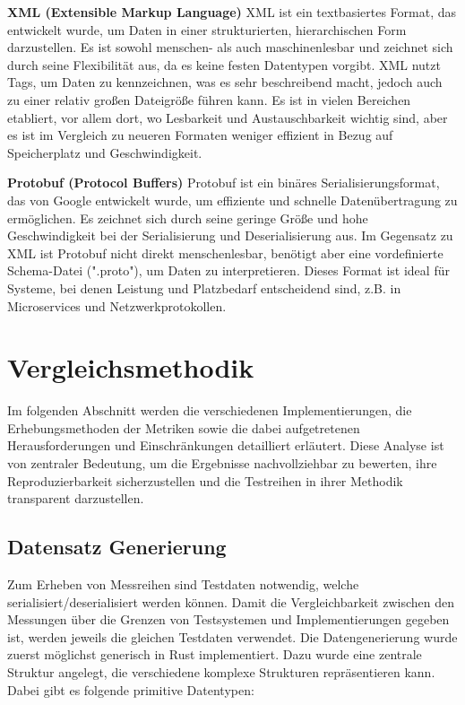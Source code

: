 \documentclass[ngerman]{seminarvorlage}
\begin{document}
\textbf{XML (Extensible Markup Language)} \cite{w3c_xml}
XML ist ein textbasiertes Format, das entwickelt wurde, um Daten in einer strukturierten, hierarchischen Form darzustellen. Es ist sowohl menschen- als auch maschinenlesbar und zeichnet sich durch seine Flexibilität aus, da es keine festen Datentypen vorgibt. XML nutzt Tags, um Daten zu kennzeichnen, was es sehr beschreibend macht, jedoch auch zu einer relativ großen Dateigröße führen kann. Es ist in vielen Bereichen etabliert, vor allem dort, wo Lesbarkeit und Austauschbarkeit wichtig sind, aber es ist im Vergleich zu neueren Formaten weniger effizient in Bezug auf Speicherplatz und Geschwindigkeit.

\textbf{Protobuf (Protocol Buffers)} \cite{protobuf}
Protobuf ist ein binäres Serialisierungsformat, das von Google entwickelt wurde, um effiziente und schnelle Datenübertragung zu ermöglichen. Es zeichnet sich durch seine geringe Größe und hohe Geschwindigkeit bei der Serialisierung und Deserialisierung aus. Im Gegensatz zu XML ist Protobuf nicht direkt menschenlesbar, benötigt aber eine vordefinierte Schema-Datei (".proto"), um Daten zu interpretieren. Dieses Format ist ideal für Systeme, bei denen Leistung und Platzbedarf entscheidend sind, z.B. in Microservices und Netzwerkprotokollen.

\section{Vergleichsmethodik}

Im folgenden Abschnitt werden die verschiedenen Implementierungen, die Erhebungsmethoden der Metriken sowie die dabei aufgetretenen Herausforderungen und Einschränkungen detailliert erläutert. Diese Analyse ist von zentraler Bedeutung, um die Ergebnisse nachvollziehbar zu bewerten, ihre Reproduzierbarkeit sicherzustellen und die Testreihen in ihrer Methodik transparent darzustellen.

\subsection{Datensatz Generierung}

Zum Erheben von Messreihen sind Testdaten notwendig, welche serialisiert/deserialisiert werden können. Damit die Vergleichbarkeit zwischen den Messungen über die Grenzen von Testsystemen und Implementierungen gegeben ist, werden jeweils die gleichen Testdaten verwendet. Die Datengenerierung wurde zuerst möglichst generisch in Rust implementiert. Dazu wurde eine zentrale Struktur angelegt, die verschiedene komplexe Strukturen repräsentieren kann. Dabei gibt es folgende primitive Datentypen:
\end{document}
